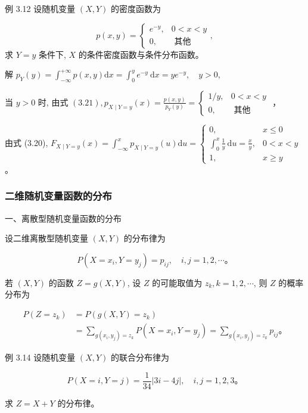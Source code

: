 \documentclass{beamer}
\begin{document}
	\begin{frame}
		例 3.12 设随机变量 $(X, Y)$ 的密度函数为
		
		$$
		p(x, y)=\left\{\begin{array}{ll}
			e^{-y}, & 0<x<y \\
			0, & \text { 其他 }
		\end{array},\right.
		$$
		求 $Y=y$ 条件下, $X$ 的条件密度函数与条件分布函数。
	\end{frame}
	
	\begin{frame}
		解 $p_{Y}(y)=\int_{-\infty}^{+\infty} p(x, y) \mathrm{d} x=\int_{0}^{y} e^{-y} \mathrm{~d} x=y e^{-y}, \quad y>0$,
		
		当 $y>0$ 时, 由式 $(3.21), p_{X \mid Y=y}(x)=\frac{p(x, y)}{p_{Y}(y)}=\left\{\begin{array}{ll}1 / y, & 0<x<y \\ 0, & \text { 其他 }\end{array}\right.$ ，
		
		由式 (3.20), $F_{X \mid Y=y}(x)=\int_{-\infty}^{x} p_{X \mid Y=y}(u) \mathrm{d} u=\left\{\begin{array}{ll}0, & x \leqslant 0 \\ \int_{0}^{x} \frac{1}{y} \mathrm{~d} u=\frac{x}{y}, & 0<x<y \\ 1, & x \geqslant y\end{array}\right.$ 。
	\end{frame}
	
	\begin{frame}
		\frametitle{二维随机变量函数的分布}
		一、离散型随机变量函数的分布
		
		设二维离散型随机变量 $(X, Y)$ 的分布律为
		
		$$
		P\left(X=x_{i}, Y=y_{j}\right)=p_{i j}, \quad i, j=1,2, \cdots 。
		$$
		
		若 $(X, Y)$ 的函数 $Z=g(X, Y)$, 设 $Z$ 的可能取值为 $z_{k}, k=1,2, \cdots$, 则 $Z$ 的概率分布为
		
		$$
		\begin{aligned}
			P\left(Z=z_{k}\right) & =P\left(g(X, Y)=z_{k}\right) \\
			& =\sum_{g\left(x_{i}, y_{j}\right)=z_{k}} P\left(X=x_{i}, Y=y_{j}\right)=\sum_{g\left(x_{i}, y_{j}\right)=z_{k}} p_{i j} 。
		\end{aligned}
		$$
	\end{frame}
	
	\begin{frame}
		例 3.14 设随机变量 $(X, Y)$ 的联合分布律为
		
		$$
		P(X=i, Y=j)=\frac{1}{34}|3 i-4 j|, \quad i, j=1,2,3 。
		$$
		
		求 $Z=X+Y$ 的分布律。
	\end{frame}
\end{document}
